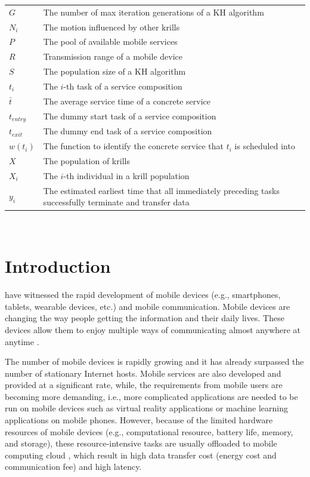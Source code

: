 \documentclass[journal]{IEEEtran}
\begin{document}
\begin{tabular}{@{} l p{7.36cm} }
$G$           &   The number of max iteration generations of a KH algorithm \\
$N_i$         &   The motion influenced by other krills \\
$P$           &   The pool of available mobile services \\
$R$           &   Transmission range of a mobile device \\
$S$           &   The population size of a KH algorithm \\
$t_i$         &   The $i$-th task of a service composition \\
$\bar{t}$     &   The average service time of a concrete service \\
$t_{entry}$   &   The dummy start task of a service composition \\
$t_{exit}$    &   The dummy end task of a service composition \\
$w(t_i)$      &   The function to identify the concrete service that $t_i$ is scheduled into \\
$X$           &   The population of krills \\
$X_i$         &   The $i$-th individual in a krill population \\
$y_i$         &   The estimated earliest time that all immediately preceding tasks successfully terminate and transfer data \\
\end{tabular}
~\\

\IEEEpeerreviewmaketitle

\section{Introduction}

 have witnessed the rapid development of mobile devices (e.g., smartphones, tablets, wearable devices, etc.) and mobile communication.
Mobile devices are changing the way people getting the information and their daily lives.
These devices allow them to enjoy multiple ways of communicating almost anywhere at anytime \cite{satyanarayanan2010mobile}.

The number of mobile devices is rapidly growing and it has already surpassed the number of stationary Internet hosts.
Mobile services are also developed and provided at a significant rate, while, the requirements from mobile users are becoming more demanding, i.e., more complicated applications are needed to be run on mobile devices such as virtual reality applications \cite{bastug2017toward} or machine learning applications \cite{abadi2016TensorFlow} on mobile phones. However, because of the limited hardware resources of mobile devices (e.g., computational resource, battery life, memory, and storage), these resource-intensive tasks are usually offloaded to mobile computing cloud \cite{dinh2013survey}, which result in high data transfer cost (energy cost and communication fee) and high latency.
\end{document}
